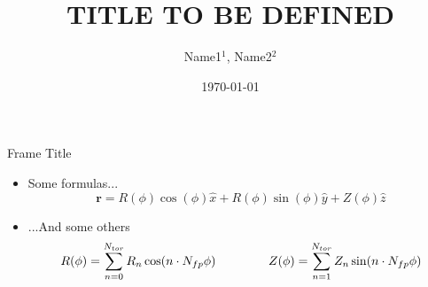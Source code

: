 \documentclass[aspectratio=169,xcolor=dvipsnames,8pt]{beamer}
\title[Summary]{TITLE TO BE DEFINED}
\author[S.Guinchard] {Name1$^{1}$, Name2$^{2}$}
\institute[SPH] %
{
    $^1$ Ecole Polytechnique Fédérale de Lausanne (EPFL), Physics Section (SPH), CH-1015 Lausanne, Switzerland\\
    $^2$ Ecole Polytechnique Fédérale de Lausanne (EPFL), Swiss Plasma Center (SPC), CH-1015 Lausanne, Switzerland\\
    \vspace{1cm}
}
\date{\today} %
\newcommand{\beq}{\begin{equation}}
\newcommand{\eeq}{\end{equation}}
\begin{document}
\begin{frame}
    \titlepage
\end{frame}


\begin{frame}{Frame Title}

\begin{itemize}


\item{Some formulas...
\beq
\textbf{r}= R(\phi)\cos(\phi) \hat{x} + R(\phi)\sin(\phi)\hat{y}+Z(\phi)\hat{z}
\eeq
}
\item{...And some others
\beq
R(\phi)=\sum_{n=0}^{N_{tor}}R_n\cos(n\cdot N_{fp}\phi) \hspace{1.5cm} Z(\phi)=\sum_{n=1}^{N_{tor}}Z_n\sin(n\cdot N_{fp}\phi) 
\eeq
}
\end{itemize}


\end{frame}
\end{document}
